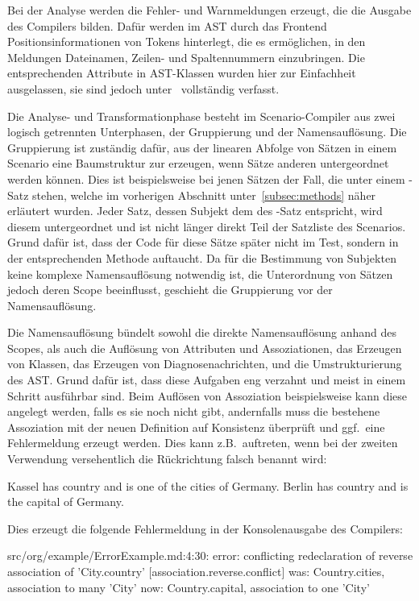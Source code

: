 Bei der Analyse werden die Fehler- und Warnmeldungen erzeugt, die die Ausgabe des Compilers bilden.
Dafür werden im AST durch das Frontend Positionsinformationen von Tokens hinterlegt, die es ermöglichen,
in den Meldungen Dateinamen, Zeilen- und Spaltennummern einzubringen.
Die entsprechenden Attribute in AST-Klassen wurden hier zur Einfachheit ausgelassen,
sie sind jedoch unter~\cite{gts-definitions} vollständig verfasst.

Die Analyse- und Transformationphase besteht im Scenario-Compiler aus zwei logisch getrennten Unterphasen,
der Gruppierung und der Namensauflösung.
Die Gruppierung ist zuständig dafür, aus der linearen Abfolge von Sätzen in einem Scenario eine Baumstruktur zur erzeugen,
wenn Sätze anderen untergeordnet werden können.
Dies ist beispielsweise bei jenen Sätzen der Fall, die unter einem -Satz stehen, welche im vorherigen Abschnitt unter~\ref{subsec:methods} näher erläutert wurden.
Jeder Satz, dessen Subjekt dem des -Satz entspricht, wird diesem untergeordnet und ist nicht länger direkt Teil der Satzliste des Scenarios.
Grund dafür ist, dass der Code für diese Sätze später nicht im Test, sondern in der entsprechenden Methode auftaucht.
Da für die Bestimmung von Subjekten keine komplexe Namensauflösung notwendig ist,
die Unterordnung von Sätzen jedoch deren Scope beeinflusst, geschieht die Gruppierung vor der Namensauflösung.

Die Namensauflösung bündelt sowohl die direkte Namensauflösung anhand des Scopes,
als auch die Auflösung von Attributen und Assoziationen, das Erzeugen von Klassen, das Erzeugen von Diagnosenachrichten,
und die Umstrukturierung des AST\@.
Grund dafür ist, dass diese Aufgaben eng verzahnt und meist in einem Schritt ausführbar sind.
Beim Auflösen von Assoziation beispielsweise kann diese angelegt werden, falls es sie noch nicht gibt,
andernfalls muss die bestehene Assoziation mit der neuen Definition auf Konsistenz überprüft und ggf.\ eine Fehlermeldung erzeugt werden.
Dies kann z.B.\ auftreten, wenn bei der zweiten Verwendung versehentlich die Rückrichtung falsch benannt wird:

\begin{codeblock}
    Kassel has country and is one of the cities of Germany.
    Berlin has country and is the capital of Germany.
\end{codeblock}

Dies erzeugt die folgende Fehlermeldung in der Konsolenausgabe des Compilers:

\begin{codeblock}
    src/org/example/ErrorExample.md:4:30: error: conflicting redeclaration of reverse association of 'City.country' [association.reverse.conflict]
    was: Country.cities, association to many 'City'
    now: Country.capital, association to one 'City'
\end{codeblock}

